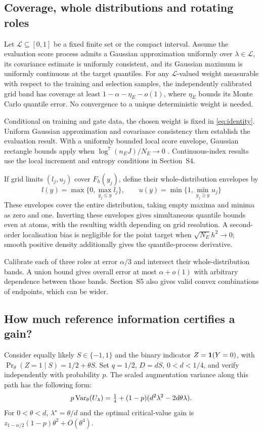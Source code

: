 \subsection{Coverage, whole distributions and rotating roles}
\begin{theorem}\label{th:coverage}
Let $\mathcal L\subseteq[0,1]$ be a fixed finite set or the compact interval. Assume the evaluation score process admits a Gaussian approximation uniformly over $\lambda\in\mathcal L$, its covariance estimate is uniformly consistent, and its Gaussian maximum is uniformly continuous at the target quantiles. For any $\mathcal L$-valued weight measurable with respect to the training and selection samples, the independently calibrated grid band has coverage at least $1-\alpha-\eta_E-o(1)$, where $\eta_E$ bounds its Monte Carlo quantile error. No convergence to a unique deterministic weight is needed.
\end{theorem}
Conditional on training and gate data, the chosen weight is fixed in \eqref{eq:identity}.
Uniform Gaussian approximation and covariance consistency then establish the evaluation result.
With a uniformly bounded local score envelope, Gaussian rectangle bounds apply when $\log^7(n_EJ)/N_E\to0$ \citep{cck2016clt}.
Continuous-index results use the local increment and entropy conditions in Section~S4.

If grid limits $(l_j,u_j)$ cover $F_h(y_j)$, define their whole-distribution envelopes by
\begin{equation}\label{eq:envelope}
 l(y)=\max\{0,\max_{y_j\leq y}l_j\},\qquad
 u(y)=\min\{1,\min_{y_j\geq y}u_j\}
\end{equation}
These envelopes cover the entire distribution, taking empty maxima and minima as zero and one.
Inverting these envelopes gives simultaneous quantile bounds even at atoms, with the resulting width depending on grid resolution.
A second-order localisation bias is negligible for the point target when $\sqrt{N_E}h^2\to0$; smooth positive density additionally gives the quantile-process derivative.

Calibrate each of three roles at error $\alpha/3$ and intersect their whole-distribution bands.
A union bound gives overall error at most $\alpha+o(1)$ with arbitrary dependence between those bands.
Section~S5 also gives valid convex combinations of endpoints, which can be wider.

\subsection{How much reference information certifies a gain?}
Consider equally likely $S\in\{-1,1\}$ and the binary indicator $Z=\mathbf 1(Y=0)$, with
$\Pr_\theta(Z=1\mid S)=1/2+\theta S$. Set $q=1/2$, $D=dS$, $0<d<1/4$, and verify independently with probability $p$.
The scaled augmentation variance along this path has the following form:
\begin{equation}\label{eq:binary}
 p\operatorname{Var}_\theta(U_\lambda)=\tfrac14+(1-p)(d^2\lambda^2-2d\theta\lambda).
\end{equation}
For $0<\theta<d$, $\lambda^\star=\theta/d$ and the optimal critical-value gain is
$z_{1-\alpha/2}(1-p)\theta^2+O(\theta^4)$.

